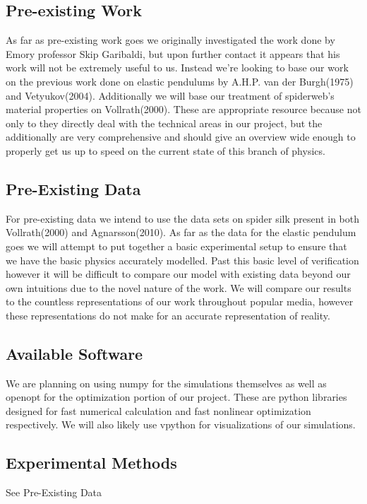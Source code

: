 \subsection{Pre-existing Work}
As far as pre-existing work goes we originally investigated the work done by Emory professor Skip Garibaldi, but upon further contact it appears that his work will not be extremely useful to us. Instead we're looking to base our work on the previous work done on elastic pendulums by A.H.P. van der Burgh(1975) and Vetyukov(2004). Additionally we will base our treatment of spiderweb's material properties on Vollrath(2000). These are appropriate resource because not only to they directly deal with the technical areas in our project, but the additionally are very comprehensive and should give an overview wide enough to properly get us up to speed on the current state of this branch of physics.

\subsection{Pre-Existing Data}
For pre-existing data we intend to use the data sets on spider silk present in both Vollrath(2000) and Agnarsson(2010). As far as the data for the elastic pendulum goes we will attempt to put together a basic experimental setup to ensure that we have the basic physics accurately modelled. Past this basic level of verification however it will be difficult to compare our model with existing data beyond our own intuitions due to the novel nature of the work. We will compare our results to the countless representations of our work throughout popular media, however these representations do not make for an  accurate representation of reality.

\subsection{Available Software}
We are planning on using numpy for the simulations themselves as well as openopt for the optimization portion of our project. These are python libraries designed for fast numerical calculation and fast nonlinear optimization respectively. We will also likely use vpython for visualizations of our simulations.

\subsection{Experimental Methods}
See Pre-Existing Data

